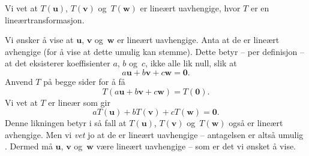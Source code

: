 \documentclass[notitlepage,a4paper,12pt,norsk]{IMFeksamen}
\newcommand{\V}[1]{\mathbf{#1}}
\renewcommand{\u}{\V{u}}
\renewcommand{\v}{\V{v}}
\newcommand{\w}{\V{w}}
\newcommand{\0}{\V{0}}
\newcommand{\oppgslutt}{
\begin{center}
\pgfornament[width=6cm]{88}
\end{center}
}
\newenvironment{losning}{\begin{oppgave}}{\oppgslutt\end{oppgave}}
\begin{document}
\begin{losning}
Vi vet at $T(\u)$, $T(\v)$ og~$T(\w)$ er lineært uavhengige, hvor $T$ er en lineærtransformasjon. 

Vi ønsker å vise at $\u$, $\v$ og~$\w$ er lineært uavhengige. Anta at de er lineært avhengige (for å vise at dette umulig kan stemme). Dette betyr -- per definisjon -- at det eksisterer koeffisienter $a$, $b$ og~$c$, ikke alle lik null, slik at
\[
a\u+b\v+c\w=\0. 
\]
Anvend $T$ på begge sider for å få 
\[
T(a\u+b\v+c\w)=T(\0). 
\]
Vi vet at $T$ er lineær som gir
\[
aT(\u)+bT(\v)+cT(\w)=\0. 
\]
Denne likningen betyr i så fall at $T(\u)$, $T(\v)$ og~$T(\w)$ også er lineært avhengige. Men vi \emph{vet} jo at de er lineært uavhengige -- antagelsen er altså umulig . Dermed må $\u$, $\v$ og~$\w$ være lineært uavhengige -- som er det vi ønsket å vise.
\end{losning}
\end{document}
